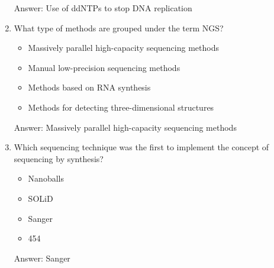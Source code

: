 \begin{enumerate}
Answer: Use of ddNTPs to stop DNA replication

\item What type of methods are grouped under the term NGS?
\begin{itemize}
\item Massively parallel high-capacity sequencing methods
\item Manual low-precision sequencing methods
\item Methods based on RNA synthesis
\item Methods for detecting three-dimensional structures
\end{itemize}

Answer: Massively parallel high-capacity sequencing methods

\item Which sequencing technique was the first to implement the concept of sequencing by synthesis?
\begin{itemize}
\item Nanoballs
\item SOLiD
\item Sanger
\item 454
\end{itemize}

Answer: Sanger
\end{enumerate}